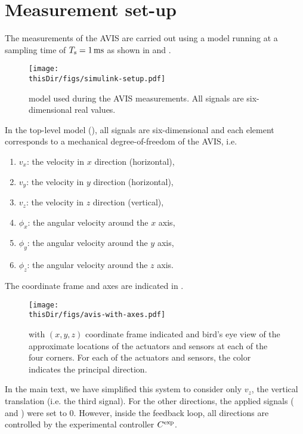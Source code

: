 
\section{ Measurement set-up}
\label{app:avis-setup}
The measurements of the \gls{AVIS} are carried out using a \Simulink model running at a sampling time of $T_{\mathrm{s}} = 1\,\mathrm{ms}$ as shown in  and .

\begin{figure}
\setlength\figurewidth{\columnwidth}
  \texttt{[image: \\thisDir/figs/simulink-setup.pdf]}
  \caption[\Simulink model used on the ]{\Simulink model used during the AVIS measurements. All signals are six-dimensional real values.}
  \label{fig:avis:simulink:setup}
\end{figure}

In the top-level model (), all signals are six-dimensional and each element corresponds to a mechanical degree-of-freedom of the \gls{AVIS}, i.e. 
\begin{enumerate}
  \item $v_x$: the velocity in $x$ direction (horizontal),
  \item $v_y$: the velocity in $y$ direction (horizontal),
  \item $v_z$: the velocity in $z$ direction (vertical),
  \item $\phi_x$: the angular velocity around the $x$ axis,
  \item $\phi_y$: the angular velocity around the $y$ axis,
  \item $\phi_z$: the angular velocity around the $z$ axis.
\end{enumerate}
The coordinate frame and axes are indicated in .

\begin{figure}
  \centering
  \texttt{[image: \\thisDir/figs/avis-with-axes.pdf]}
  \caption[ with coordinate frame, sensors and actuators.]{ with $(x,y,z)$ coordinate frame indicated and bird's eye view of the approximate locations of the actuators and sensors at each of the four corners. For each of the actuators and sensors, the color indicates the principal direction.}
  \label{fig:avis:withAxes}
\end{figure}

In the main text, we have simplified this system to consider only $v_z$, the vertical translation (i.e. the third signal).
For the other directions, the applied signals ( and ) were set to $0$.
However, inside the feedback loop, all directions are controlled by the experimental controller $C^{\mathrm{exp}}$.

